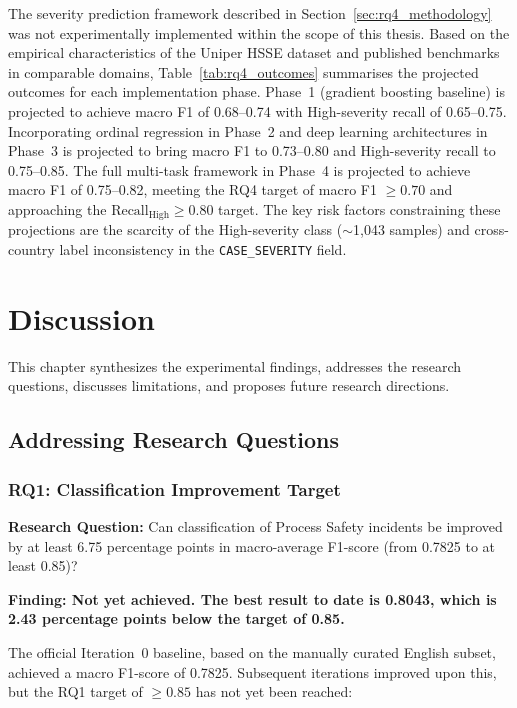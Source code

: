 \documentclass[11pt, titlepage, bibliography=totoc]{scrreprt}
\begin{document}
The severity prediction framework described in Section~\ref{sec:rq4_methodology} was not experimentally implemented within the scope of this thesis. Based on the empirical characteristics of the Uniper HSSE dataset and published benchmarks in comparable domains, Table~\ref{tab:rq4_outcomes} summarises the projected outcomes for each implementation phase. Phase~1 (gradient boosting baseline) is projected to achieve macro F1 of 0.68--0.74 with High-severity recall of 0.65--0.75. Incorporating ordinal regression in Phase~2 and deep learning architectures in Phase~3 is projected to bring macro F1 to 0.73--0.80 and High-severity recall to 0.75--0.85. The full multi-task framework in Phase~4 is projected to achieve macro F1 of 0.75--0.82, meeting the RQ4 target of macro F1 $\geq 0.70$ and approaching the $\text{Recall}_\text{High} \geq 0.80$ target. The key risk factors constraining these projections are the scarcity of the High-severity class ($\sim$1{,}043 samples) and cross-country label inconsistency in the \texttt{CASE\_SEVERITY} field.

\chapter{Discussion}

This chapter synthesizes the experimental findings, addresses the research questions, discusses limitations, and proposes future research directions.

\section{Addressing Research Questions}

\subsection{RQ1: Classification Improvement Target}

\textbf{Research Question:} Can classification of Process Safety incidents be improved by at least 6.75 percentage points in macro-average F1-score (from 0.7825 to at least 0.85)?

\textbf{Finding: Not yet achieved. The best result to date is 0.8043, which is 2.43 percentage points below the target of 0.85.}

The official Iteration~0 baseline, based on the manually curated English subset, achieved a macro F1-score of 0.7825. Subsequent iterations improved upon this, but the RQ1 target of $\geq 0.85$ has not yet been reached:
\end{document}
